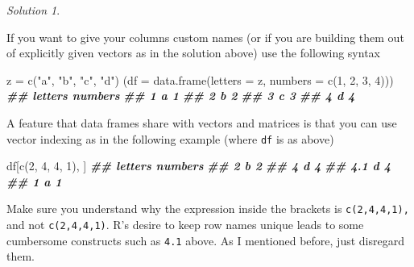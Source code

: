 \documentclass[
]{book}
\newenvironment{Shaded}{\begin{snugshade}}{\end{snugshade}}
\newcommand{\AttributeTok}[1]{\textcolor[rgb]{0.77,0.63,0.00}{#1}}
\newcommand{\DecValTok}[1]{\textcolor[rgb]{0.00,0.00,0.81}{#1}}
\newcommand{\DocumentationTok}[1]{\textcolor[rgb]{0.56,0.35,0.01}{\textbf{\textit{#1}}}}
\newcommand{\FunctionTok}[1]{\textcolor[rgb]{0.00,0.00,0.00}{#1}}
\newcommand{\NormalTok}[1]{#1}
\newcommand{\OtherTok}[1]{\textcolor[rgb]{0.56,0.35,0.01}{#1}}
\newcommand{\SpecialCharTok}[1]{\textcolor[rgb]{0.00,0.00,0.00}{#1}}
\newcommand{\StringTok}[1]{\textcolor[rgb]{0.31,0.60,0.02}{#1}}
\theoremstyle{definition}
\theoremstyle{definition}
\theoremstyle{definition}
\theoremstyle{definition}
\theoremstyle{remark}
\newtheorem*{solution}{Solution}
\begin{document}
\begin{solution}
\begin{Shaded}
\end{Shaded}

If you want to give your columns custom names (or if you are building them out
of explicitly given vectors as in the solution above) use the following syntax

\begin{Shaded}
\begin{Highlighting}[]
\NormalTok{z }\OtherTok{=} \FunctionTok{c}\NormalTok{(}\StringTok{"a"}\NormalTok{, }\StringTok{"b"}\NormalTok{, }\StringTok{"c"}\NormalTok{, }\StringTok{"d"}\NormalTok{)}
\NormalTok{(}\AttributeTok{df =} \FunctionTok{data.frame}\NormalTok{(}\AttributeTok{letters =}\NormalTok{ z, }\AttributeTok{numbers =} \FunctionTok{c}\NormalTok{(}\DecValTok{1}\NormalTok{, }\DecValTok{2}\NormalTok{, }\DecValTok{3}\NormalTok{, }\DecValTok{4}\NormalTok{)))}
\DocumentationTok{\#\#   letters numbers}
\DocumentationTok{\#\# 1       a       1}
\DocumentationTok{\#\# 2       b       2}
\DocumentationTok{\#\# 3       c       3}
\DocumentationTok{\#\# 4       d       4}
\end{Highlighting}
\end{Shaded}

A feature that data frames share with vectors and matrices is that you can use vector indexing as in the following example (where \texttt{df} is as above)

\begin{Shaded}
\begin{Highlighting}[]
\NormalTok{df[}\FunctionTok{c}\NormalTok{(}\DecValTok{2}\NormalTok{, }\DecValTok{4}\NormalTok{, }\DecValTok{4}\NormalTok{, }\DecValTok{1}\NormalTok{), ]}
\DocumentationTok{\#\#     letters numbers}
\DocumentationTok{\#\# 2         b       2}
\DocumentationTok{\#\# 4         d       4}
\DocumentationTok{\#\# 4.1       d       4}
\DocumentationTok{\#\# 1         a       1}
\end{Highlighting}
\end{Shaded}

Make sure you understand why the expression inside the brackets is \texttt{c(2,4,4,1),}
and not \texttt{c(2,4,4,1)}. R's desire to keep row names unique leads to some
cumbersome constructs such as \texttt{4.1} above. As I mentioned before, just disregard
them.


\end{solution}
\end{document}
